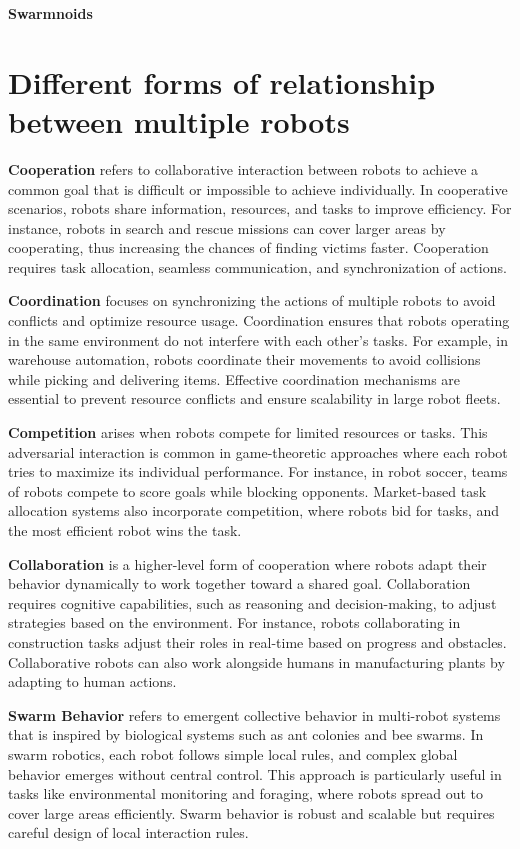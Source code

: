 \textbf{Swarmnoids}



\section{Different forms of relationship between multiple robots}

\textbf{Cooperation} refers to collaborative interaction between robots to achieve a common goal that is difficult or impossible to achieve individually. In cooperative scenarios, robots share information, resources, and tasks to improve efficiency. For instance, robots in search and rescue missions can cover larger areas by cooperating, thus increasing the chances of finding victims faster. Cooperation requires task allocation, seamless communication, and synchronization of actions. 

\textbf{Coordination} focuses on synchronizing the actions of multiple robots to avoid conflicts and optimize resource usage. Coordination ensures that robots operating in the same environment do not interfere with each other’s tasks. For example, in warehouse automation, robots coordinate their movements to avoid collisions while picking and delivering items. Effective coordination mechanisms are essential to prevent resource conflicts and ensure scalability in large robot fleets. 

\textbf{Competition} arises when robots compete for limited resources or tasks. This adversarial interaction is common in game-theoretic approaches where each robot tries to maximize its individual performance. For instance, in robot soccer, teams of robots compete to score goals while blocking opponents. Market-based task allocation systems also incorporate competition, where robots bid for tasks, and the most efficient robot wins the task. 

\textbf{Collaboration} is a higher-level form of cooperation where robots adapt their behavior dynamically to work together toward a shared goal. Collaboration requires cognitive capabilities, such as reasoning and decision-making, to adjust strategies based on the environment. For instance, robots collaborating in construction tasks adjust their roles in real-time based on progress and obstacles. Collaborative robots can also work alongside humans in manufacturing plants by adapting to human actions. 

\textbf{Swarm Behavior} refers to emergent collective behavior in multi-robot systems that is inspired by biological systems such as ant colonies and bee swarms. In swarm robotics, each robot follows simple local rules, and complex global behavior emerges without central control. This approach is particularly useful in tasks like environmental monitoring and foraging, where robots spread out to cover large areas efficiently. Swarm behavior is robust and scalable but requires careful design of local interaction rules. 

